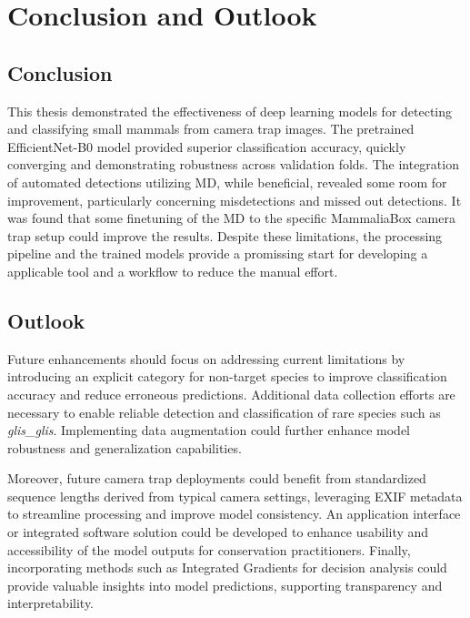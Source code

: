 


\section{Conclusion and Outlook}
\label{conclusion_outlook}

\subsection{Conclusion}

This thesis demonstrated the effectiveness of deep learning models for detecting and classifying small mammals from camera trap images.
The pretrained EfficientNet-B0 model provided superior classification accuracy, quickly converging and demonstrating robustness across validation folds.
The integration of automated detections utilizing \ac{MD}, while beneficial, revealed some room for improvement, particularly concerning misdetections and missed out detections.
It was found that some finetuning of the \ac{MD} to the specific MammaliaBox camera trap setup could improve the results.
Despite these limitations, the processing pipeline and the trained models provide a promissing start for developing a applicable tool and a workflow to reduce the manual effort.


\subsection{Outlook}

Future enhancements should focus on addressing current limitations by introducing an explicit category for non-target species to improve classification accuracy and reduce erroneous predictions.
Additional data collection efforts are necessary to enable reliable detection and classification of rare species such as \textit{glis\_glis}.
Implementing data augmentation could further enhance model robustness and generalization capabilities.

Moreover, future camera trap deployments could benefit from standardized sequence lengths derived from typical camera settings, leveraging \ac{EXIF} metadata to streamline processing and improve model consistency.
An application interface or integrated software solution could be developed to enhance usability and accessibility of the model outputs for conservation practitioners.
Finally, incorporating methods such as Integrated Gradients for decision analysis could provide valuable insights into model predictions, supporting transparency and interpretability.

